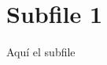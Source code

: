 \documentclass[../demo.tex]{subfiles}
\begin{document}
\chapter{Subfile 1}
Aquí el subfile
\end{document}
